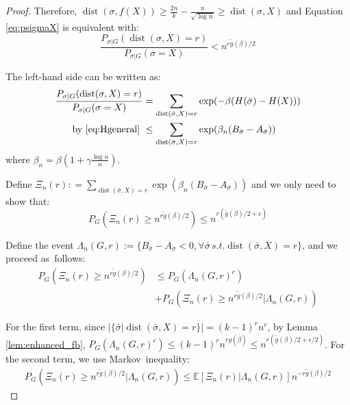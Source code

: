 \documentclass[entropy,article,accept,moreauthors,pdftex]{Definitions/mdpi}
\newcommand{\1}{\mathbbm{1}}
\DeclareMathOperator{\Dist}{dist}
\begin{document}
\begin{paracol}{2}
\begin{proof}
Therefore, $\Dist(\sigma, f(X)) \geq \frac{2n}{k} - \frac{n}{\sqrt{\log n}} \geq \Dist(\sigma, X)$ and Equation
\eqref{eq:psigmaX} is equivalent with:
\begin{equation}\label{eq:psigmaX2}
\frac{P_{\sigma|G}(\Dist(\sigma, X)=r)}
{P_{\sigma|G}(\sigma=X)} <
n^{r \tilde{g}(\beta) /2}
\end{equation}

The left-hand side can be written as:
\begin{align*}
\frac{P_{\sigma|G}(\Dist(\sigma, X)=r)}
{P_{\sigma|G}(\sigma=X)}  &= \sum_{\Dist(\bar{\sigma}, X)=r}\exp(-\beta(H(\bar{\sigma})-H(X)))\\
\textrm{ by \eqref{eq:Hgeneral} } &\leq \sum_{\Dist(\bar{\sigma}, X)=r}\exp(\beta_n(B_{\bar{\sigma}}-A_{\bar{\sigma}}))
\end{align*}
where $\beta_n = \beta(1+\gamma\frac{\log n}{n})$.

Define $\Xi_n(r): = \sum_{\Dist(\bar{\sigma}, X)=r}\exp(\beta_n(B_{\bar{\sigma}}-A_{\bar{\sigma}}))$ and we only need to show that:
\begin{equation}
P_{G}(\Xi_n(r) \geq n^{r \tilde{g}(\beta) /2}) \leq  n^{r (\tilde{g}(\beta) /2 + \epsilon)}
\end{equation}

Define the event $\Lambda_n(G,r):=\{B_{\bar{\sigma}} -A_{\bar{\sigma}} < 0, \forall \bar{\sigma}\, s.t. \Dist(\bar{\sigma}, X)=r\}$,
and we proceed as~follows:
\begin{align*}
P_{G}(\Xi_n(r) \geq n^{r \tilde{g}(\beta) /2}) &\leq
P_G(\Lambda_n(G,r)^c) \\
&+ P_G(\Xi_n(r) \geq n^{r \tilde{g}(\beta) /2} |\Lambda_n(G,r) )
\end{align*}

For the first term, since $|\{ \bar{\sigma} | \Dist(\bar{\sigma}, X) = r \}|=(k-1)^r n^r$,
by Lemma \ref{lem:enhanced_fb},\linebreak
$P_G(\Lambda_n(G,r)^c) \leq (k-1)^r n^{rg(\bar{\beta})} \leq n^{r (\tilde{g}(\beta) /2 + \epsilon/2)}$.
For the second term, we use Markov~inequality:
\begin{align*}
P_G(\Xi_n(r) \geq n^{r \tilde{g}(\beta) /2} |\Lambda_n(G,r) )
\leq \mathbb{E}[\Xi_n(r)|\Lambda_n(G,r)]n^{-r \tilde{g}(\beta) /2} 
\end{align*}


\end{proof}
\end{paracol}
\end{document}
